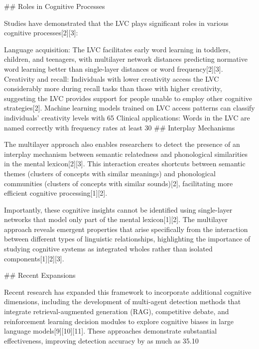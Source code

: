 ## Roles in Cognitive Processes

Studies have demonstrated that the LVC plays significant roles in various cognitive processes[2][3]:

Language acquisition: The LVC facilitates early word learning in toddlers, children, and teenagers, with multilayer network distances predicting normative word learning better than single-layer distances or word frequency[2][3].
Creativity and recall: Individuals with lower creativity access the LVC considerably more during recall tasks than those with higher creativity, suggesting the LVC provides support for people unable to employ other cognitive strategies[2]. Machine learning models trained on LVC access patterns can classify individuals’ creativity levels with 65%
Clinical applications: Words in the LVC are named correctly with frequency rates at least 30%
## Interplay Mechanisms

The multilayer approach also enables researchers to detect the presence of an interplay mechanism between semantic relatedness and phonological similarities in the mental lexicon[2][3]. This interaction creates shortcuts between semantic themes (clusters of concepts with similar meanings) and phonological communities (clusters of concepts with similar sounds)[2], facilitating more efficient cognitive processing[1][2].

Importantly, these cognitive insights cannot be identified using single-layer networks that model only part of the mental lexicon[1][2]. The multilayer approach reveals emergent properties that arise specifically from the interaction between different types of linguistic relationships, highlighting the importance of studying cognitive systems as integrated wholes rather than isolated components[1][2][3].

## Recent Expansions

Recent research has expanded this framework to incorporate additional cognitive dimensions, including the development of multi-agent detection methods that integrate retrieval-augmented generation (RAG), competitive debate, and reinforcement learning decision modules to explore cognitive biases in large language models[9][10][11]. These approaches demonstrate substantial effectiveness, improving detection accuracy by as much as 35.10%

